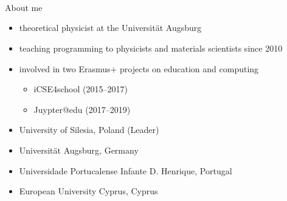 \documentclass[svgnames]{beamer}
\begin{document}
\begin{frame}[t]
 \vspace{1.5truecm}
 \begin{center}
  \\[0.2truecm]
  \\[0.8truecm]
  \\[0.1truecm]
 \end{center}
\end{frame}

\begin{frame}{About me}
 \begin{itemize}
  \item theoretical physicist at the Universität Augsburg
  \item teaching programming to physicists and materials scientists since 2010
  \item involved in two Erasmus+ projects on education and computing
	\begin{itemize}
         \item iCSE4school (2015--2017)
	 \item Juypter@edu (2017--2019)
	\end{itemize}
 \end{itemize}

 \vspace{0.8truecm}
 \qquad {}

 \begin{itemize}
  \item University of Silesia, Poland (Leader)
  \item Universität Augsburg, Germany
  \item Universidade Portucalense Infante D. Henrique, Portugal
  \item European University Cyprus, Cyprus
 \end{itemize}
\end{frame}
\end{document}
